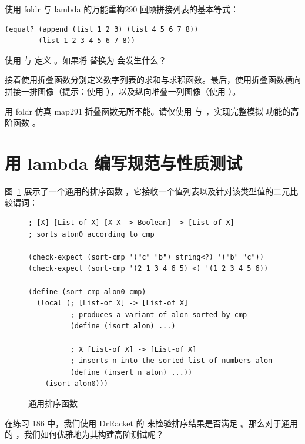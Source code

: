 \begin{exercise}{使用 foldr 与 lambda 的万能重构}{290}
回顾拼接列表的基本等式：
\begin{lstlisting}[language=BSL]
(equal? (append (list 1 2 3) (list 4 5 6 7 8))
        (list 1 2 3 4 5 6 7 8))
\end{lstlisting}
使用  与  定义 。如果将  替换为  会发生什么？

接着使用折叠函数分别定义数字列表的求和与求积函数。最后，使用折叠函数横向拼接一排图像（提示：使用 ），以及纵向堆叠一列图像（使用 ）。
\end{exercise}

\begin{exercise}{用 foldr 仿真 map}{291}
折叠函数无所不能。请仅使用  与 ，实现完整模拟  功能的高阶函数 。
\end{exercise}

\section{用 lambda 编写规范与性质测试}
\label{sec:17_4}

图~\ref{fig:103} 展示了一个通用的排序函数 ，它接收一个值列表以及针对该类型值的二元比较谓词：

\begin{figure}[htbp]
  \centering
\begin{lstlisting}[language=BSL, basicstyle=\scriptsize\ttfamily]
; [X] [List-of X] [X X -> Boolean] -> [List-of X]
; sorts alon0 according to cmp

(check-expect (sort-cmp '("c" "b") string<?) '("b" "c"))
(check-expect (sort-cmp '(2 1 3 4 6 5) <) '(1 2 3 4 5 6))

(define (sort-cmp alon0 cmp)
  (local (; [List-of X] -> [List-of X]
          ; produces a variant of alon sorted by cmp
          (define (isort alon) ...)

          ; X [List-of X] -> [List-of X]
          ; inserts n into the sorted list of numbers alon
          (define (insert n alon) ...))
    (isort alon0)))
\end{lstlisting}
  \caption{通用排序函数}
  \label{fig:103}
\end{figure}

在练习 186 中，我们使用 DrRacket 的  来检验排序结果是否满足 。那么对于通用的 ，我们如何优雅地为其构建高阶测试呢？

